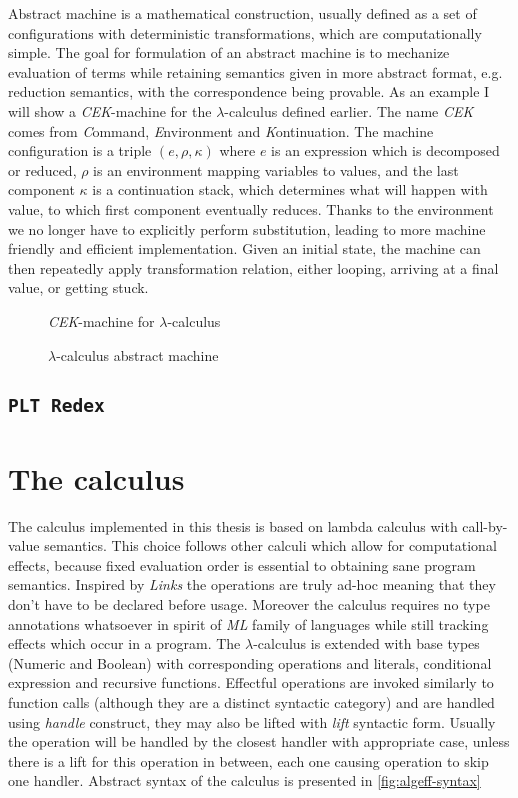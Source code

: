 \documentclass[inz, english, shortabstract]{iithesis}
\newcommand{\Redex}{\texttt{PLT Redex} }
\newcommand{\LC}{\(\lambda\)-calculus }
\begin{document}
Abstract machine is a mathematical construction, usually defined as a set of configurations with deterministic transformations, which are computationally simple.
The goal for formulation of an abstract machine is to mechanize evaluation of terms while retaining semantics given in more abstract format, e.g. reduction semantics, with the correspondence being provable\cite{Felleisen2009}.
As an example I will show a \emph{CEK}-machine for the \LC defined earlier.
The name \emph{CEK} comes from \emph{C}ommand, \emph{E}nvironment and \emph{K}ontinuation.
The machine configuration is a triple $ (e, \rho, \kappa) $ where $ e $ is an expression which is decomposed or reduced, $ \rho $ is an environment mapping variables to values, and the last component $ \kappa $ is a continuation stack, which determines what will happen with value, to which first component eventually reduces.
Thanks to the environment we no longer have to explicitly perform substitution, leading to more machine friendly and efficient implementation.
Given an initial state, the machine can then repeatedly apply transformation relation, either looping, arriving at a final value, or getting stuck. 
\begin{figure}
  \emph{CEK}-machine for \LC
  \caption{\LC abstract machine}
  \label{fig:lc-cek}
\end{figure}

\section{\Redex}

\chapter{The calculus}\label{ch:calculus}
The calculus implemented in this thesis is based on lambda calculus with call-by-value semantics.
This choice follows other calculi which allow for computational effects, because fixed evaluation order is essential to obtaining sane program semantics.
Inspired by \emph{Links} \cite{Hillerstrom2016} the operations are truly ad-hoc meaning that they don't have to be declared before usage.
Moreover the calculus requires no type annotations whatsoever in spirit of \emph{ML} family of languages while still tracking effects which occur in a program.
The \LC is extended with base types (Numeric and Boolean) with corresponding operations and literals, conditional expression and recursive functions.
Effectful operations are invoked similarly to function calls (although they are a distinct syntactic category) and are handled using \textit{handle} construct, they may also be lifted with \textit{lift} syntactic form.
Usually the operation will be handled by the closest handler with appropriate case, unless there is a lift for this operation in between, each one causing operation to skip one handler.
Abstract syntax of the calculus is presented in \autoref{fig:algeff-syntax}
\end{document}

